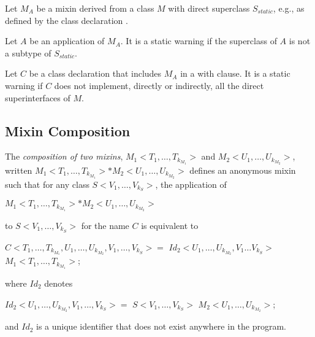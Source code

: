 \documentclass{article}
\begin{document}
\LMHash{}
Let $M_A$ be a mixin derived from a class $M$ with direct superclass $S_{static}$, e.g., as defined by the class declaration .

\LMHash{}
Let $A$ be an application of $M_A$.
It is a static warning if the superclass of $A$ is not a subtype of $S_{static}$.

\LMHash{}
Let $C$ be a class declaration that includes $M_A$ in a with clause.
It is a static warning if $C$ does not implement, directly or indirectly, all the direct superinterfaces of $M$.


\subsection{Mixin Composition}


\LMHash{}
The {\em composition of two mixins}, $M_1<T_1, \ldots, T_{k_{M_1}}>$ and $M_2<U_1, \ldots, U_{k_{M_2}}>$, written $M_1<T_1, \ldots, T_{k_{M_1}}> * M_2<U_1, \ldots, U_{k_{M_2}}>$ defines an anonymous mixin such that for any class $S<V_1, \ldots, V_{k_S}>$, the application of

$M_1<T_1, \ldots, T_{k_{M_1}}> * M_2<U_1, \ldots, U_{k_{M_2}}>$

to $S<V_1, \ldots, V_{k_S}>$ for the name $C$ is equivalent to

\begin{dartCode}
\ABSTRACT{} \CLASS{} $C<T_1, \ldots, T_{k_{M_1}}, U_1, \ldots, U_{k_{M_2}}, V_1, \ldots, V_{k_S}> = $
      $Id_2<U_1, \ldots, U_{k_{M_2}}, V_1 \ldots V_{k_S}>$ \WITH{} $M_1 <T_1, \ldots, T_{k_{M_1}}>$;
\end{dartCode}

where $Id_2$ denotes

\begin{dartCode}
\ABSTRACT{} \CLASS{} $Id_2<U_1, \ldots, U_{k_{M_2}}, V_1, \ldots, V_{k_S}> =$
                         $S<V_1, \ldots, V_{k_S}>$ \WITH{} $M_2<U_1, \ldots, U_{k_{M_2}}>$;
\end{dartCode}

and $Id_2$ is a unique identifier that does not exist anywhere in the program.

\end{document}

